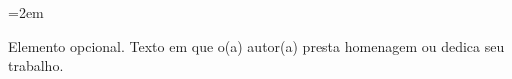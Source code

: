 
\clearpage
\thispagestyle{empty}

\vspace*{13cm}

\noindent\hfill
\begin{minipage}{\dimexpr\textwidth-8cm\relax}
    \setlength{\parindent}{0pt}
    \justifying
    \emergencystretch=2em

    \noindent
    Elemento opcional. Texto em que o(a) autor(a)
    presta homenagem ou dedica seu trabalho.
    \par
\end{minipage}

\clearpage
